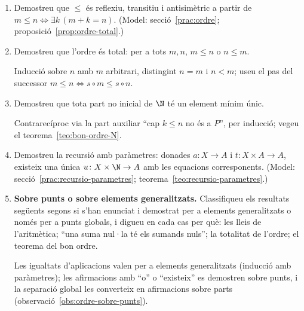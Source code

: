 \begin{enumerate}[resume]
  \item Demostreu que \(\le\) és reflexiu, transitiu i antisimètric a partir de \(m\le n\iff\exists k\,(m+k=n)\). (Model: secció~\ref{prac:ordre}; proposició~\ref{prop:ordre-total}.)

  \item Demostreu que l'ordre és total: per a tots \(m,n\), \(m\le n\) o \(n\le m\). \begin{indicacio}Inducció sobre \(n\) amb \(m\) arbitrari, distingint \(n=m\) i \(n<m\); useu el pas del successor \(m\le n\iff s\circ m\le s\circ n\).\end{indicacio}

  \item Demostreu que tota part no inicial de \(\N\) té un element mínim únic. \begin{indicacio}Contrarecíproc via la part auxiliar \enquote{cap \(k\le n\) no és a \(P\)}, per inducció; vegeu el teorema~\ref{teo:bon-ordre-N}.\end{indicacio}

  \item Demostreu la recursió amb paràmetres: donades \(a\colon X\to A\) i \(t\colon X\times A\to A\), existeix una única \(u\colon X\times\N\to A\) amb les equacions corresponents. (Model: secció~\ref{prac:recursio-parametres}; teorema~\ref{teo:recursio-parametres}.)

  \item \textbf{Sobre punts o sobre elements generalitzats.} Classifiqueu els resultats següents segons si s'han enunciat i demostrat per a elements generalitzats o només per a punts globals, i digueu en cada cas per què: les lleis de l'aritmètica; \enquote{una suma nul·la té els sumands nuls}; la totalitat de l'ordre; el teorema del bon ordre. \begin{indicacio}Les igualtats d'aplicacions valen per a elements generalitzats (inducció amb paràmetres); les afirmacions amb \enquote{o} o \enquote{existeix} es demostren sobre punts, i la separació global les converteix en afirmacions sobre parts (observació~\ref{obs:ordre-sobre-punts}).\end{indicacio}
\end{enumerate}
